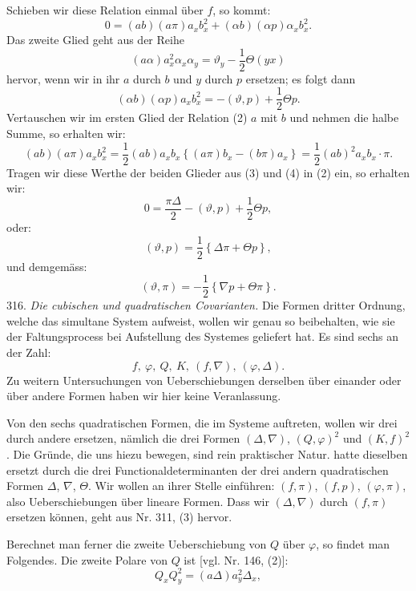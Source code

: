 \documentclass[11pt]{article}
\providecommand{\gesperrt}[1]{\textls[130]{#1}}
\providecommand{\weberpage}[1]{}
\providecommand{\weq}[2]{\begin{equation}\tag{#1}#2\end{equation}}
\let\Delta\varDelta
\let\Theta\varTheta
\begin{document}
\weberpage{339}
Schieben wir diese Relation einmal über $f$, so kommt:
\weq{2}{0 = (ab)(a\pi)a_xb_x^2 + (\alpha b)(\alpha p)\alpha_xb_x^2.}
Das zweite Glied geht aus der Reihe
\[
(a\alpha)a_x^2\alpha_x\alpha_y = \vartheta_y - \frac{1}{2}\Theta(yx)
\]
hervor, wenn wir in ihr $a$ durch $b$ und $y$ durch $p$ ersetzen; es folgt dann
\weq{3}{(\alpha b)(\alpha p)a_xb_x^2 = -(\vartheta,p) + \frac{1}{2}\Theta p.}
Vertauschen wir im ersten Glied der Relation (2) $a$ mit $b$ und nehmen die halbe Summe, so erhalten wir:
\weq{4}{(ab)(a\pi)a_xb_x^2 = \frac{1}{2}(ab)a_xb_x\left\{(a\pi)b_x - (b\pi)a_x\right\} = \frac{1}{2}(ab)^2a_xb_x\cdot\pi.}
Tragen wir diese Werthe der beiden Glieder aus (3) und (4) in (2) ein, so erhalten wir:
\[
0 = \frac{\pi\Delta}{2} - (\vartheta,p) + \frac{1}{2}\Theta p,
\]
oder:
\weq{5}{(\vartheta,p) = \frac{1}{2}\left\{\Delta\pi + \Theta p\right\},}
und demgemäss:
\weq{6}{(\vartheta,\pi) = -\frac{1}{2}\left\{\nabla p + \Theta \pi\right\}.}
316. \textit{Die cubischen und quadratischen Covarianten.} Die Formen dritter Ordnung, welche das simultane System aufweist, wollen wir genau so beibehalten, wie sie der Faltungsprocess bei Aufstellung des Systemes geliefert hat. Es sind sechs an der Zahl:
\[
f,\ \varphi,\ Q,\ K,\ (f,\nabla),\ (\varphi,\Delta).
\]
Zu weitern Untersuchungen von Ueberschiebungen derselben über einander oder über andere Formen haben wir hier keine Veranlassung.

Von den sechs quadratischen Formen, die im Systeme auftreten, wollen wir drei durch andere ersetzen, nämlich die drei Formen $(\Delta,\nabla)$, $(Q,\varphi)^2$ und $(K,f)^2$. Die Gründe, die uns hiezu bewegen, sind rein praktischer Natur. \gesperrt{Clebsch} hatte dieselben ersetzt durch die drei Functionaldeterminanten der drei andern quadratischen Formen $\Delta$, $\nabla$, $\Theta$. Wir wollen an ihrer Stelle einführen: $(f,\pi)$, $(f,p)$, $(\varphi,\pi)$, also Ueberschiebungen über lineare Formen. Dass wir $(\Delta,\nabla)$ durch $(f,\pi)$ ersetzen können, geht aus Nr. 311, (3) hervor.

Berechnet man ferner die zweite Ueberschiebung von $Q$ über $\varphi$, so findet man Folgendes. Die zweite Polare von $Q$ ist [vgl. Nr. 146, (2)]:
\[
Q_xQ_y^2 = (a\Delta)a_y^2\Delta_x,
\]
\end{document}
